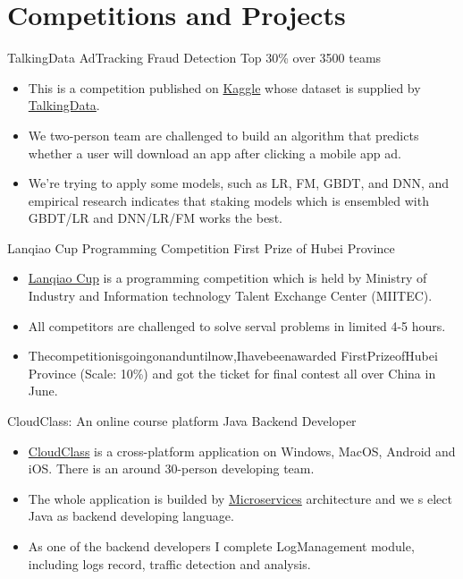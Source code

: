 \documentclass[letterpaper]{twentysecondcv} %
\begin{document}
\newpage %
\makeprofile %

\section{Competitions and Projects}

\begin{twentyshort}
	\setlength{\itemsep}{0pt}
	\setlength{\parsep}{0pt}
	\setlength{\parskip}{0pt}
		{\quad TalkingData AdTracking Fraud Detection}
		{Top 30\% over 3500 teams}
		{
			\begin{itemize}
				\item This is a competition published on \href{https://www.kaggle.com/c/talkingdata-adtracking-fraud-detection}{Kaggle}
				whose dataset is supplied by \href{https://www.talkingdata.com/}{TalkingData}.
				\item We two-person team are challenged to build an algorithm that predicts whether a user will download an app after clicking a mobile app ad.
				\item We're trying to apply some models, such as LR, FM, GBDT, and DNN, 
				and empirical research indicates that staking models which is ensembled with 
				GBDT/LR and DNN/LR/FM works the best.
			\end{itemize}
		}
		{\quad Lanqiao Cup Programming Competition}
		{First Prize of Hubei Province}
		{
			\begin{itemize}
				\item \href{http://dasai.lanqiao.cn/}{Lanqiao Cup} is a programming competition which is held by Ministry of Industry and Information technology Talent Exchange Center (MIITEC).
				\item All competitors are challenged to solve serval problems in limited 4-5 hours.
				\item Thecompetitionisgoingonanduntilnow,Ihavebeenawarded FirstPrizeofHubei Province (Scale: 10\%) and got the ticket for final contest all over China in June.
			\end{itemize}
		}
		{\quad CloudClass: An online course platform}
		{Java Backend Developer}
		{
			\begin{itemize}
				\item \href{https://www.dxtwangxiao.com/}{CloudClass} is a cross-platform application on Windows, MacOS, Android and iOS. There is an around 30-person developing team.
				\item The whole application is builded by \href{https://en.wikipedia.org/wiki/Microservices}{Microservices} architecture and we s elect Java as backend developing language.
				\item As one of the backend developers I complete LogManagement module, including logs record, traffic detection and analysis.
			\end{itemize}
		}
\end{twentyshort}
\end{document}
